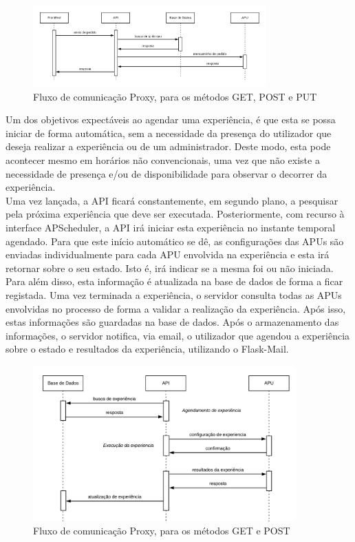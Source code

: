 \begin{figure}[!ht]
    \centering
    \includegraphics[width=0.8\textwidth]{images/fluxo3.png}
    \caption{Fluxo de comunicação Proxy, para os métodos GET, POST e PUT}
    \label{fig:proxy}
\end{figure}
\newpage
Um dos objetivos expectáveis ao agendar uma experiência, é que esta se possa iniciar de forma automática, sem a necessidade da presença do utilizador que deseja realizar a experiência ou de um administrador. Deste modo, esta pode acontecer mesmo em horários não convencionais, uma vez que não existe a necessidade de presença e/ou de disponibilidade para observar o decorrer da experiência.\newline\\
Uma vez lançada, a API ficará constantemente, em segundo plano, a pesquisar pela próxima experiência que deve ser executada. Posteriormente, com recurso à interface APScheduler, a API irá iniciar esta experiência no instante temporal agendado. Para que este início automático se dê, as configurações das APUs são enviadas individualmente para cada APU envolvida na experiência e esta irá retornar sobre o seu estado. Isto é, irá indicar se a mesma foi ou não iniciada. Para além disso, esta informação é atualizada na base de dados de forma a ficar registada. Uma vez terminada a experiência, o servidor consulta todas as APUs envolvidas no processo de forma a validar a realização da experiência. Após isso, estas informações são guardadas na base de dados. Após o armazenamento das informações, o servidor notifica, via email, o utilizador que agendou a experiência sobre o estado e resultados da experiência, utilizando o Flask-Mail.
\begin{figure}[!ht]
    \centering
    \includegraphics[width=0.9\textwidth]{images/fluxo4.png}
    \caption{Fluxo de comunicação Proxy, para os métodos GET e POST}
    \label{fig:agendamento}
\end{figure}
